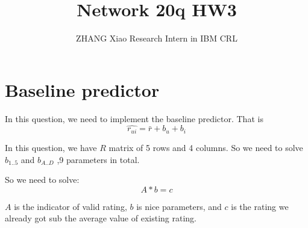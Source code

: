\documentclass[12pt,a4paper]{article}
\author{ZHANG Xiao Research Intern in IBM CRL}
\title{Network 20q HW3}
\begin{document}
\maketitle
\pagebreak

\section{Baseline predictor}

In this question, we need to implement the baseline predictor. That is 
\begin{equation}
\hat{r_{ui}} = \bar{r} + b_{u} + b_{i}
\end{equation}

In this question, we have $R$ matrix of 5 rows and 4 columns. So we need to solve $b_{1..5}$ and $b_{A..D}$ ,9 parameters in total.

So we need to solve:
\begin{equation}
A * b = c
\end{equation}

$A$ is the indicator of valid rating, $b$ is nice parameters, and $c$ is the rating we already got sub the average value of existing rating.
\end{document}
